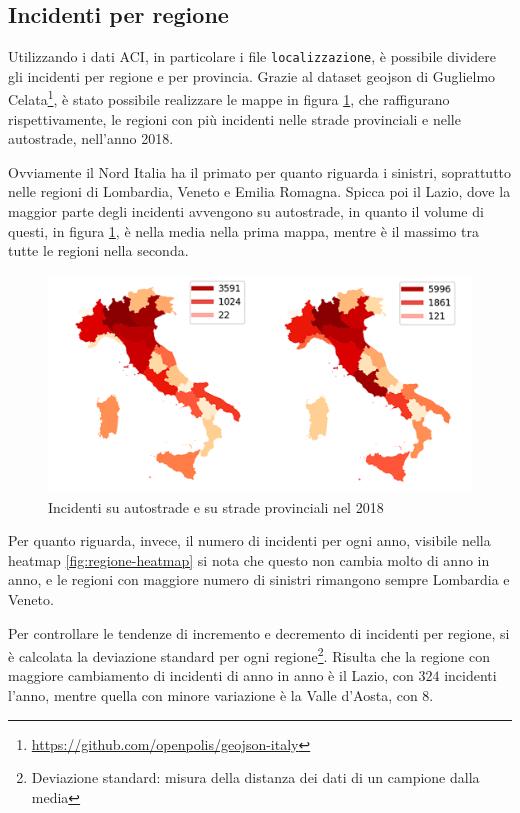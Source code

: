 \documentclass[a4paper,12pt]{report}
\newcommand{\columnstyle}[1]{\texttt{#1}}
\begin{document}
\subsection{Incidenti per regione}

Utilizzando i dati ACI, in particolare i file \columnstyle{localizzazione}, è 
possibile dividere gli incidenti per regione e per provincia.
Grazie al dataset geojson di Guglielmo 
Celata\footnote{\url{https://github.com/openpolis/geojson-italy}}, 
è stato possibile realizzare le mappe in figura \ref{fig:incidenti-per-regione}, 
che raffigurano rispettivamente, le regioni con più incidenti 
nelle strade provinciali e nelle autostrade, nell'anno 2018.

Ovviamente il Nord Italia ha il primato per quanto riguarda i sinistri, 
soprattutto nelle regioni di Lombardia, Veneto e Emilia Romagna. 
Spicca poi il Lazio, dove la maggior parte degli incidenti avvengono su autostrade, 
in quanto il volume di questi, in figura \ref{fig:incidenti-per-regione}, 
è nella media nella prima mappa, mentre è il massimo tra tutte le regioni nella seconda.

\begin{figure}
    \includegraphics[width=\linewidth]{img_unite/incidenti_autostrade_provinciali.png}
    \caption{Incidenti su autostrade e su strade provinciali nel 2018}
    \label{fig:incidenti-per-regione}
\end{figure}

Per quanto riguarda, invece, il numero di incidenti per ogni anno, 
visibile nella heatmap \ref{fig:regione-heatmap} 
si nota che questo non cambia molto di anno in anno, e le regioni con maggiore numero 
di sinistri rimangono sempre Lombardia e Veneto.

Per controllare le tendenze di incremento e decremento di incidenti per regione, 
si è calcolata la deviazione standard per ogni regione\footnote{Deviazione standard: 
misura della distanza dei dati di un campione dalla media\cite{PROB_E_STATISTICA:2}}.
Risulta che la regione con maggiore cambiamento di incidenti di anno in anno 
è il Lazio, con $324$ incidenti l'anno, mentre quella con minore 
variazione è la Valle d'Aosta, con $8$.
\end{document}
